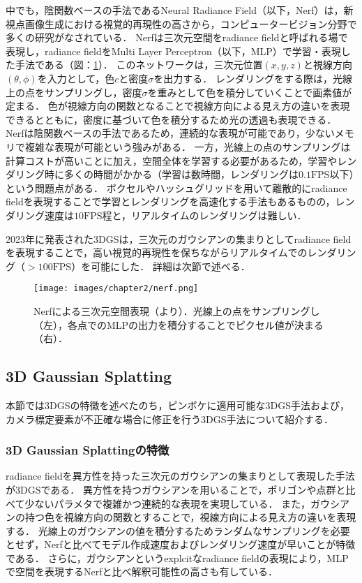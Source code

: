 中でも，陰関数ベースの手法であるNeural Radiance Field（以下，Nerf）\cite{nerf}は，新視点画像生成における視覚的再現性の高さから，コンピュータービジョン分野で多くの研究がなされている．
Nerfは三次元空間をradiance fieldと呼ばれる場で表現し，radiance fieldをMulti Layer Perceptron（以下，MLP）で学習・表現した手法である（図：\ref{fig:nerf}）．
このネットワークは，三次元位置$(x,y,z)$と視線方向$(\theta, \phi)$を入力として，色$c$と密度$\sigma$を出力する．
レンダリングをする際は，光線上の点をサンプリングし，密度$\sigma$を重みとして色を積分していくことで画素値が定まる．
色が視線方向の関数となることで視線方向による見え方の違いを表現できるとともに，密度に基づいて色を積分するため光の透過も表現できる．
Nerfは陰関数ベースの手法であるため，連続的な表現が可能であり，少ないメモリで複雑な表現が可能という強みがある．
一方，光線上の点のサンプリングは計算コストが高いことに加え，空間全体を学習する必要があるため，学習やレンダリング時に多くの時間がかかる（学習は数時間，レンダリングは$0.1 \mathrm{FPS}$以下）という問題点がある\cite{3dgs}．
ボクセルやハッシュグリッドを用いて離散的にradiance fieldを表現することで学習とレンダリングを高速化する手法もある\cite{plenoxels}\cite{instant-ngp}ものの，レンダリング速度は$10 \mathrm{FPS}$程と，リアルタイムのレンダリングは難しい．\par

2023年に発表された3DGS\cite{3dgs}は，三次元のガウシアンの集まりとしてradiance fieldを表現することで，高い視覚的再現性を保ちながらリアルタイムでのレンダリング（$>100 \mathrm{FPS}$）を可能にした．
詳細は次節で述べる．
\begin{figure}[h]
  \centering
  \texttt{[image: images/chapter2/nerf.png]}
  \caption[Nerfによる三次元空間表現]{Nerfによる三次元空間表現（\cite{nerf}より）．光線上の点をサンプリングし（左），各点でのMLPの出力を積分することでピクセル値が決まる（右）．}
  \label{fig:nerf}
\end{figure}

\subsection{3D Gaussian Splatting}\label{subsec:3dgs_researches} 
本節では3DGSの特徴を述べたのち，ピンボケに適用可能な3DGS手法および，カメラ標定要素が不正確な場合に修正を行う3DGS手法について紹介する．

\subsubsection{3D Gaussian Splattingの特徴}\label{subsubsec:feature_of_3dgs}
radiance fieldを異方性を持った三次元のガウシアンの集まりとして表現した手法が3DGS\cite{3dgs}である．
異方性を持つガウシアンを用いることで，ポリゴンや点群と比べて少ないパラメタで複雑かつ連続的な表現を実現している．
また，ガウシアンの持つ色を視線方向の関数とすることで，視線方向による見え方の違いを表現する．
光線上のガウシアンの値を積分するためランダムなサンプリングを必要とせず，Nerfと比べてモデル作成速度およびレンダリング速度が早いことが特徴である．
さらに，ガウシアンというexplcitなradiance fieldの表現により，MLPで空間を表現するNerfと比べ解釈可能性の高さも有している．\par

